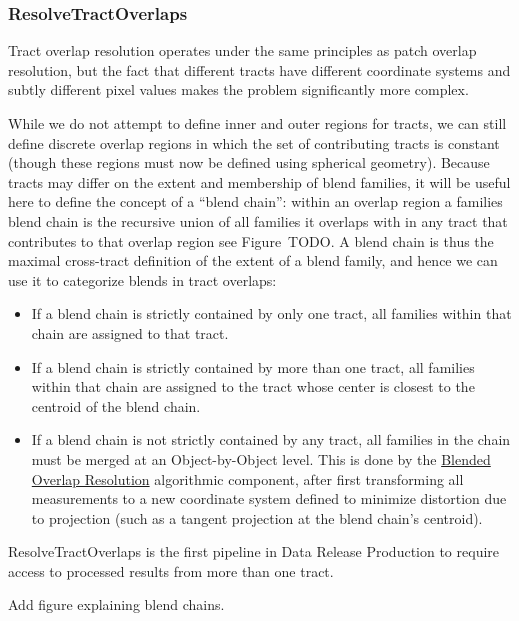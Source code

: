 \subsubsection{ResolveTractOverlaps}
\label{sec:drpResolveTractOverlaps}

Tract overlap resolution operates under the same principles as patch overlap resolution, but the fact that different tracts have different coordinate systems and subtly different pixel values makes the problem significantly more complex.

While we do not attempt to define inner and outer regions for tracts, we can still define discrete overlap regions in which the set of contributing tracts is constant (though these regions must now be defined using spherical geometry).  Because tracts may differ on the extent and membership of blend families, it will be useful here to define the concept of a ``blend chain'': within an overlap region a families blend chain is the recursive union of all families it overlaps with in any tract that contributes to that overlap region see Figure~TODO.  A blend chain is thus the maximal cross-tract definition of the extent of a blend family, and hence we can use it to categorize blends in tract overlaps:
\begin{itemize}
\item If a blend chain is strictly contained by only one tract, all families within that chain are assigned to that tract.
\item If a blend chain is strictly contained by more than one tract, all families within that chain are assigned to the tract whose center is closest to the centroid of the blend chain.
\item If a blend chain is not strictly contained by any tract, all families in the chain must be merged at an Object-by-Object level.  This is done by the \hyperref[sec:acBlendedOverlapResolution]{Blended Overlap Resolution} algorithmic component, after first transforming all measurements to a new coordinate system defined to minimize distortion due to projection (such as a tangent projection at the blend chain's centroid).
\end{itemize}

ResolveTractOverlaps is the first pipeline in Data Release Production to require access to processed results from more than one tract.

\begin{note}[TODO]
  Add figure explaining blend chains.
\end{note}

